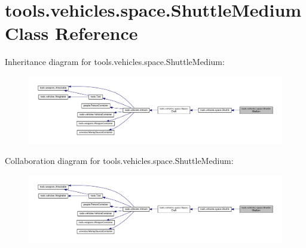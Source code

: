 \hypertarget{classtools_1_1vehicles_1_1space_1_1_shuttle_medium}{}\section{tools.\+vehicles.\+space.\+Shuttle\+Medium Class Reference}
\label{classtools_1_1vehicles_1_1space_1_1_shuttle_medium}


Inheritance diagram for tools.\+vehicles.\+space.\+Shuttle\+Medium\+:
\nopagebreak
\begin{figure}[H]
\begin{center}
\leavevmode
\includegraphics[width=350pt]{classtools_1_1vehicles_1_1space_1_1_shuttle_medium__inherit__graph}
\end{center}
\end{figure}


Collaboration diagram for tools.\+vehicles.\+space.\+Shuttle\+Medium\+:
\nopagebreak
\begin{figure}[H]
\begin{center}
\leavevmode
\includegraphics[width=350pt]{classtools_1_1vehicles_1_1space_1_1_shuttle_medium__coll__graph}
\end{center}
\end{figure}
